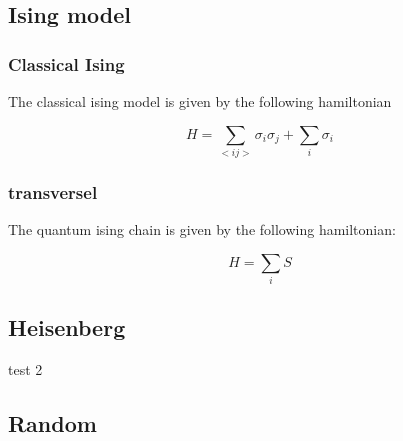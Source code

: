 \subsection{Ising model}

\subsubsection{Classical Ising}

The classical ising model is given by the following hamiltonian

\begin{equation}
    H = \sum_{<i j>} \sigma_i \sigma_j + \sum_i \sigma_i
\end{equation}

\subsubsection{transversel}


The quantum ising chain is given by the following hamiltonian:


\begin{equation}
    H = \sum_i S
\end{equation}

\subsection{Heisenberg}

test 2

\subsection{Random}
